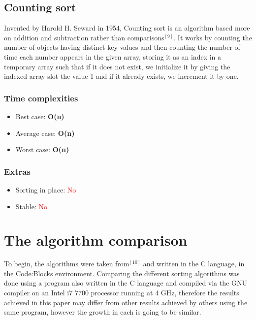 \documentclass{article}
\begin{document}
\begin{multicols}{2}
\bigbreak \bigbreak \bigbreak \bigbreak \bigbreak \bigbreak \bigbreak \bigbreak \bigbreak \bigbreak \bigbreak \bigbreak \bigbreak \bigbreak \bigbreak \bigbreak \bigbreak \bigbreak \bigbreak \bigbreak



\subsection{Counting sort}
Invented by Harold H. Seward in 1954, Counting sort is an algorithm based more on addition and subtraction rather than comparisons$^{[9]}$. It works by counting the number of objects having distinct key values and then counting the number of time each number appears in the given array, storing it as an index in a temporary array such that if it does not exist, we initialize it by giving the indexed array slot the value 1 and if it already exists, we increment it by one.
\subsubsection{Time complexities}
\begin{itemize}
    \item Best case: \textbf{O(n)}
    \item Average case: \textbf{O(n)}
    \item Worst case: \textbf{O(n)}
\end{itemize}

\subsubsection{Extras}
\begin{itemize}
    \item Sorting in place: \textcolor{red}{No}
    \item Stable: \textcolor{red}{No}
\end{itemize}

\bigbreak \bigbreak \bigbreak \bigbreak \bigbreak \bigbreak \bigbreak \bigbreak \bigbreak \bigbreak \bigbreak \bigbreak \bigbreak \bigbreak \bigbreak \bigbreak \bigbreak \bigbreak \bigbreak \bigbreak


\end{multicols}
\clearpage


\section{The algorithm comparison}
To begin, the algorithms were taken from$^{[10]}$ and written in the C language, in the Code:Blocks environment. Comparing the different sorting algorithms was done using a program also written in the C language and compiled via the GNU compiler on an Intel i7 7700 processor running at 4 GHz, therefore the results achieved in this paper may differ from other results achieved by others using the same program, however the growth in each is going to be similar. 
\end{document}
